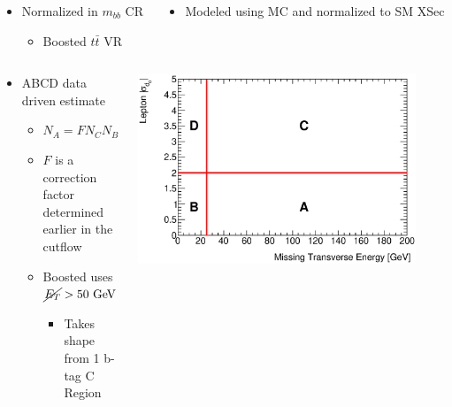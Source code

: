 \documentclass{beamer}
\newcommand*{\ttbar}{\ensuremath{t\bar{t}}\xspace}
\newcommand*{\met}{\ensuremath{\cancel{E_{T}}}\xspace}
\newcommand*{\header}[1]{\fontsize{16}{8}\selectfont \textbf{{\color{MyPurple}{#1}}}}
\begin{document}
\begin{frame}
\begin{center}
\header{Resolved Background Determination}
\end{center}
\begin{columns}
\begin{column}{0.5\textwidth}
\color{MyPurple}{\ttbar}
\begin{itemize}
\footnotesize
\item Normalized in $m_{bb}$ CR
\begin{itemize}
\scriptsize
\item Boosted \ttbar VR
\end{itemize}
\end{itemize}
\end{column}
\begin{column}{0.5\textwidth}
\color{MyPurple}{Other MC Bkg.}
\begin{itemize}
\footnotesize
\item Modeled using MC and normalized to SM XSec
\end{itemize}
\end{column}
\end{columns}
\begin{center}
\color{MyPurple}{QCD multi-jet background}
\end{center}
\begin{columns}
\begin{column}{0.5\textwidth}
\begin{itemize}
\vspace{-0.5cm}
\footnotesize
\item ABCD data driven estimate
\begin{itemize}
\item $N_A = F N_C N_B / N_D$
\item $F$ is a correction factor determined earlier in the cutflow
\item Boosted uses $\met>50\text{ GeV}$
\begin{itemize}
\scriptsize
\item Takes shape from 1 b-tag C Region
\end{itemize}
\end{itemize}
\end{itemize}
\end{column}
\begin{column}{0.5\textwidth}
\includegraphics[width=0.9\textwidth]{figures/abcdExample_met_vs_d0sigBL20}

\end{column}
\end{columns}
\end{frame}
\end{document}
